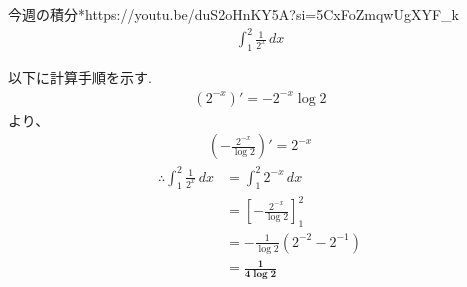 \documentclass[main]{subfiles}
\begin{document}

\begin{mondai}{4}{今週の積分}{*}{https://youtu.be/duS2oHnKY5A?si=5CxFoZmqwUgXYF_k}
    \begin{align*}
        \int_1^2 \frac{1}{2^x} \, dx
    \end{align*}
\end{mondai}


\solutionhead
\hfill
以下に計算手順を示す.
\hfill\
\begin{align*}
    \left(2^{-x}\right)'=-2^{-x}\log 2
\end{align*}
より、
\begin{align*}
    \left(-\frac{2^{-x}}{\log 2}\right)'=2^{-x}
\end{align*}
\begin{align*}
    \therefore \int_1^2 \frac{1}{2^x} \, dx
        &= \int_1^2 2^{-x} \, dx \\
        &= \left[ -\frac{2^{-x}}{\log 2}\right]_1^2 \\
        &= -\frac{1}{\log 2} \left(2^{-2}-2^{-1}\right) \\
        &= \boldsymbol{\frac{1}{4\log 2}}
\end{align*}
\end{document}
